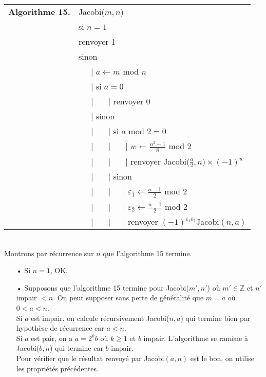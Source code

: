 \documentclass[10pt,a4paper]{report}
\begin{document}
\begin{tabular}{ll}
\textbf{Algorithme 15.} & Jacobi($m,n$)\\
           & si $n= 1$ \\
           & renvoyer 1 \\
           & sinon \\
           & \ \ \ {\rm |} $a \leftarrow m$ mod $n$ \\
           & \ \ \ {\rm |} si $a=0$  \\
           & \ \ \ {\rm |} \ \ \ {\rm |} renvoyer 0 \\
           &  \ \ \ {\rm |} sinon  \\
           & \ \ \ {\rm |} \ \ \ {\rm |} si $a$ mod 2$=0$ \\
           & \ \ \ {\rm |} \ \ \ {\rm |} \ \ \ {\rm|} $w \leftarrow \tfrac{n^2-1}{8}$ mod $2$ \\
           & \ \ \ {\rm |} \ \ \ {\rm |} \ \ \ {\rm |} renvoyer Jacobi($\tfrac{a}{2},n)\times (-1)^w$ \\           
           & \ \ \ {\rm |} \ \ \ {\rm |} sinon \\
           & \ \ \ {\rm |} \ \ \ {\rm |}\ \ \ {\rm |} $ \varepsilon_1   \leftarrow \tfrac{a-1}{2}$ mod $2$ \\
           & \ \ \ {\rm |} \ \ \ {\rm |}\ \ \ {\rm |} $ \varepsilon_2   \leftarrow \tfrac{n-1}{2}$ mod $2$ \\
           & \ \ \ {\rm |} \ \ \ {\rm |}\ \ \ {\rm |} renvoyer $(-1)^{\varepsilon_1 \varepsilon_2}$Jacobi$(n,a)$
\end{tabular}\\


Montrons par récurrence sur $n$ que l'algorithme 15 termine.
\begin{itemize}
\item[•] Si $n=1$, OK.
\item[•] Supposons que l'algorithme 15 termine pour Jacobi($m',n'$) où $m'\in \mathbb{Z}$ et $n'$ impair $<n$. On peut supposer sans perte de généralité que $m=a$ où $0<a<n$.\\
Si $a$ est impair, on calcule récursivement Jacobi($n,a$) qui termine bien par hypothèse de récurrence car $a<n$.\\
Si $a$ est pair, on a $a=2^kb$ où $k \geqslant 1$ et $b$ impair. L'algorithme se ramène à Jacobi($b,n$) qui termine car $b$ impair. \\
Pour vérifier que le résultat renvoyé par Jacobi$(a,n)$ est le bon, on utilise les propriétés précédentes.
\end{itemize}
\end{document}
